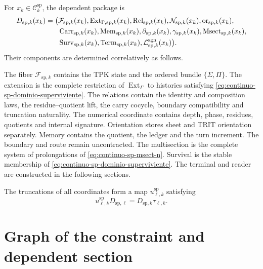For \(x_k\in\mathcal C_k^{\mathrm{sp}}\), the dependent package is
\begin{equation}
\label{eq:continuo-sp-d13}
\begin{aligned}
 D_{\mathrm{sp},k}(x_k)=\bigl(&
 \mathcal F_{\mathrm{sp},k}(x_k),
 \operatorname{Ext}_{\Gamma,\mathrm{sp},k}(x_k),
 \operatorname{Rel}_{\mathrm{sp},k}(x_k),
 \mathcal N_{\mathrm{sp},k}(x_k),
 \operatorname{or}_{\mathrm{sp},k}(x_k),\\
 &\operatorname{Carr}_{\mathrm{sp},k}(x_k),
 \operatorname{Mem}_{\mathrm{sp},k}(x_k),
 \partial_{\mathrm{sp},k}(x_k),
 \gamma_{\mathrm{sp},k}(x_k),
 \operatorname{Msect}_{\mathrm{sp},k}(x_k),\\
 &\operatorname{Surv}_{\mathrm{sp},k}(x_k),
 \operatorname{Term}_{\mathrm{sp},k}(x_k),
 \mathcal L^{\rm sgn}_{\mathrm{sp},k}(x_k)\bigr).
\end{aligned}
\end{equation}
Their components are determined correlatively as follows.

The fiber \(\mathcal F_{\mathrm{sp},k}\) contains the TPK state and the ordered
bundle \(\{\Sigma,\Pi\}\). The extension is the complete restriction of
\(\operatorname{Ext}_\Gamma\) to histories satisfying
\eqref{eq:continuo-sp-dominio-superviviente}. The relations contain the
identity and composition laws, the residue--quotient lift, the carry
cocycle, boundary compatibility and truncation naturality. The
numerical coordinate contains depth, phase, residues, quotients and internal
signature. Orientation stores sheet and TRIT orientation separately.
Memory contains the quotient, the ledger and the turn increment. The
boundary and route remain uncontracted. The multisection is the complete
system of prolongations of \eqref{eq:continuo-sp-msect-n}.
Survival is the stable membership of
\eqref{eq:continuo-sp-dominio-superviviente}. The terminal and reader are
constructed in the following sections.

The truncations of all coordinates form a map
\(u^{\mathrm{sp}}_{\ell,k}\) satisfying
\begin{equation}
\label{eq:continuo-sp-d-naturalidad}
 u^{\mathrm{sp}}_{\ell,k}D_{\mathrm{sp},\ell}
 =D_{\mathrm{sp},k}\tau_{\ell,k}.
\end{equation}

\section{Graph of the constraint and dependent section}

